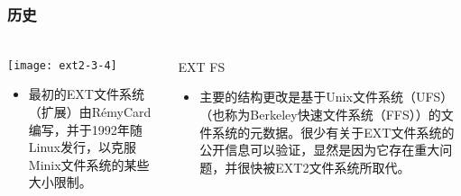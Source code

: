 \begin{frame}[fragile]
	\frametitle{历史}
	
	\frametitle{ }
	\begin{columns}[t]
		\begin{column}{.3\textwidth}

			\texttt{[image: ext2-3-4]}
			\begin{itemize}
				\item 最初的EXT文件系统（扩展）由RémyCard编写，并于1992年随Linux发行，以克服Minix文件系统的某些大小限制。
				
			\end{itemize}
			
		\end{column}
		
		\begin{column}{.7\textwidth}			
			EXT FS
			\begin{itemize}
				\item 主要的结构更改是基于Unix文件系统（UFS）（也称为Berkeley快速文件系统（FFS））的文件系统的元数据。很少有关于EXT文件系统的公开信息可以验证，显然是因为它存在重大问题，并很快被EXT2文件系统所取代。
			\end{itemize}
			
		\end{column}
	\end{columns}
	
\end{frame}


